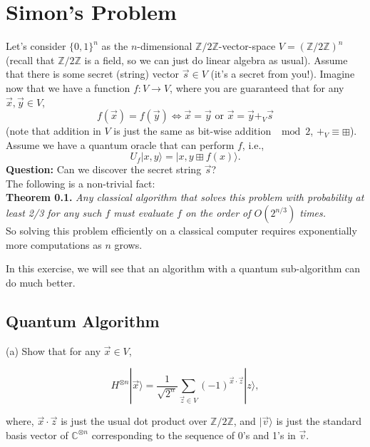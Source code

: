 \documentclass{article}
\begin{document}
\section{Simon's Problem}

Let's consider \(\{0,1\}^{n}\) as the \(n\)-dimensional \(\mathbb{Z}/2\mathbb{Z}\)-vector-space \(V = (\mathbb{Z}/2\mathbb{Z})^{n}\) (recall that \(\mathbb{Z}/2\mathbb{Z}\) is a field, so we can just do linear algebra as usual). Assume that there is some secret (string) vector \(\vec{s} \in V\) (it's a secret from you!). Imagine now that we have a function \(f: V \rightarrow V\), where you are guaranteed that for any \(\vec{x}, \vec{y} \in V\),
\[
f(\vec{x}) = f(\vec{y}) \Leftrightarrow \vec{x} = \vec{y} \text{ or } \vec{x} = \vec{y} +_{V} \vec{s}
\]
(note that addition in \(V\) is just the same as bit-wise addition \(\mod 2\), \(+_{V} \equiv \boxplus\)). Assume we have a quantum oracle that can perform \(f\), i.e.,
\[
U_{f}|x,y\rangle = |x,y \boxplus f(x)\rangle.
\]
\textbf{Question:} Can we discover the secret string \(\vec{s}\)?\\ The following is a non-trivial fact:\\
\textbf{Theorem 0.1.} \textit{Any classical algorithm that solves this problem with probability at least 2/3 for any such \(f\) must evaluate \(f\) on the order of \(O(2^{n/3})\) times.}\\
So solving this problem efficiently on a classical computer requires exponentially more computations as \(n\) grows.

In this exercise, we will see that an algorithm with a quantum sub-algorithm can do much better.

\newpage
\begin{question}[title=QUESTION 2a]
\subsection{Quantum Algorithm}

(a) Show that for any \(\vec{x} \in V\),

\[
H^{\otimes n}|\vec{x}\rangle = \frac{1}{\sqrt{2^{n}}} \sum_{\vec{z} \in V} (-1)^{\vec{x} \cdot \vec{z}} |z\rangle,
\]

where, \(\vec{x} \cdot \vec{z}\) is just the usual dot product over \(\mathbb{Z}/2\mathbb{Z}\), and \(|\vec{v}\rangle\) is just the standard basis vector of \(\mathbb{C}^{\otimes n}\) corresponding to the sequence of 0's and 1's in \(\vec{v}\).
\end{question}
\end{document}
